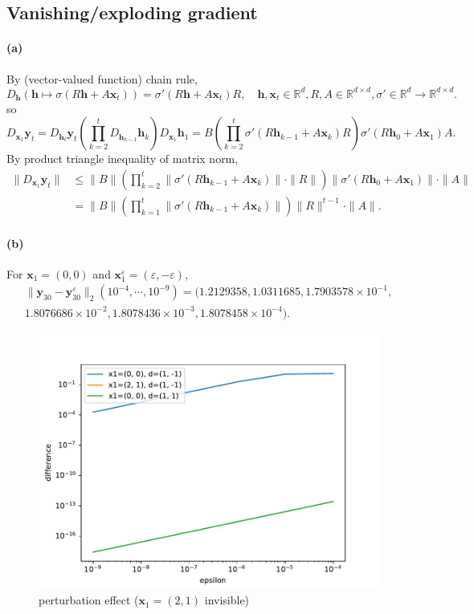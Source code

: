 \documentclass[12pt]{article}
\begin{document}
\subsection{Vanishing/exploding gradient}
\paragraph{(a)}
By (vector-valued function) chain rule,
\[ D_\mathbf{h}(\mathbf{h}\mapsto\sigma(R\mathbf{h}+A\mathbf{x}_t))=\sigma'(R\mathbf{h}+A\mathbf{x}_t)R, \hspace{1em} \mathbf{h},\mathbf{x}_t\in\mathbb{R}^d, R,A\in\mathbb{R}^{d\times d}, \sigma'\in\mathbb{R}^{d}\to\mathbb{R}^{d\times d}. \]
so
\[ D_{\mathbf{x}_1}\mathbf{y}_t =D_{\mathbf{h}_t}\mathbf{y}_t \left(\prod_{k=2}^{t}D_{\mathbf{h}_{k-1}}\mathbf{h}_k \right) D_{\mathbf{x}_1}\mathbf{h}_1=B\left( \prod_{k=2}^{t} \sigma'(R\mathbf{h}_{k-1}+A\mathbf{x}_{k})R \right)\sigma'(R\mathbf{h}_0+A\mathbf{x}_1)A. \]
By product triangle inequality of matrix norm,
\begin{align*}
\|D_{\mathbf{x}_1}\mathbf{y}_t\| &\leq \|B\| \left( \prod_{k=2}^{t} \|\sigma'(R\mathbf{h}_{k-1}+A\mathbf{x}_{k})\|\cdot\|R\| \right)\|\sigma'(R\mathbf{h}_0+A\mathbf{x}_1)\|\cdot\|A\|\\
&=\|B\|\left( \prod_{k=1}^{t} \|\sigma'(R\mathbf{h}_{k-1}+A\mathbf{x}_{k})\| \right)\|R\|^{t-1}\cdot\|A\|.
\end{align*}
\paragraph{(b)}
For \(\mathbf{x}_1=(0, 0)\) and \(\mathbf{x}_1^\varepsilon=(\varepsilon, -\varepsilon)\),
\begin{align*}
\|\mathbf{y}_{30}-\mathbf{y}_{30}^\varepsilon\|_2(10^{-4},\cdots,10^{-9})= (1.2129358, 1.0311685, 1.7903578\times10^{-1},\\ 1.8076686\times10^{-2}, 1.8078436\times10^{-3}, 1.8078458\times10^{-4}).
\end{align*}
\begin{figure}[htbp]
    \centering
    \includegraphics[scale=0.9]{Homework3/ex3.pdf}
    \caption{perturbation effect (\(\mathbf{x}_1=(2, 1)\) invisible)}
\end{figure}
\end{document}
